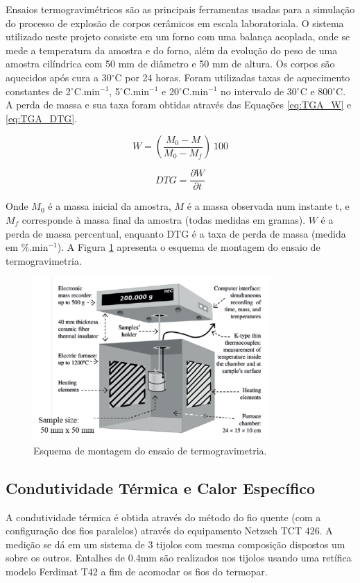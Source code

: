 Ensaios termogravimétricos são as principais ferramentas usadas para a simulação
do processo de explosão de corpos cerâmicos em escala laboratoriala. O sistema
utilizado neste projeto consiste em um forno com uma balança acoplada, onde se
mede a temperatura da amostra e do forno, além da evolução do peso de uma
amostra cilíndrica com 50 mm de diâmetro e 50 mm de altura. Os corpos são
aquecidos após cura a 30$^\circ$C por 24 horas. Foram utilizadas taxas de
aquecimento constantes de 2$^\circ$C.min$^{-1}$, 5$^\circ$C.min$^{-1}$ e
20$^\circ$C.min$^{-1}$ no intervalo de 30$^\circ$C e 800$^\circ$C. A perda de
massa e sua taxa foram obtidas através das Equações \ref{eq:TGA_W} e
\ref{eq:TGA_DTG}.

\begin{equation}
  \label{eq:TGA_W}
  W = \left( \frac{M_0-M}{M_0-M_f} \right) \ 100
\end{equation}

\begin{equation}
  \label{eq:TGA_DTG}
  DTG = \frac{\partial W}{\partial t}
\end{equation}

Onde $M_0$ é a massa inicial da amostra, $M$ é a massa observada num instante t,
e $M_f$ corresponde à massa final da amostra (todas medidas em gramas). $W$ é a
perda de massa percentual, enquanto DTG é a taxa de perda de massa (medida em
\%.min$^{-1}$). A Figura \ref{fig:TGA} apresenta o esquema de montagem do ensaio
de termogravimetria.
    
\begin{figure}[ht]
	\centering
	\includegraphics[width=9cm]{./figures/TGA.pdf}
	\caption{Esquema de montagem do ensaio de termogravimetria. \label{fig:TGA}}
\end{figure}



\subsection{Condutividade Térmica e Calor Específico}\label{mat:condutividade}
A condutividade térmica é obtida através do método do fio quente (com a
configuração dos fios paralelos) através do equipamento Netzsch TCT 426. A
medição se dá em um sistema de 3 tijolos com mesma composição dispostos um sobre
os outros. Entalhes de 0.4mm são realizados nos tijolos usando uma retífica
modelo Ferdimat T42 a fim de acomodar os fios do termopar.

